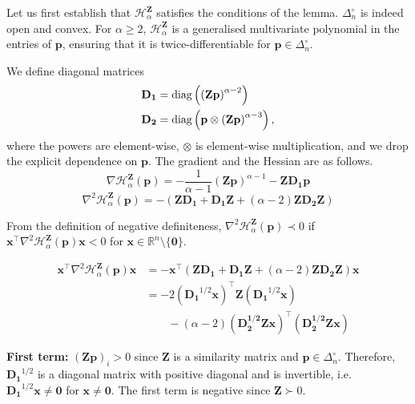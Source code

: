 \documentclass[aps,pre,floats,floatfix,superscriptaddress,twocolumn,final,10pt]{revtex4-2}
\theoremstyle{definition}
\renewcommand{\vec}[1]{\mathbf{#1}}
\newcommand{\entropy}[3]{\mathcal{H}^{#1}_{#2}\left(#3\right)}
\newcommand{\entropyname}[2]{\mathcal{H}^{#1}_{#2}}
\begin{document}
Let us first establish that $\entropyname{\vec{Z}}{\alpha}$ satisfies the conditions of the lemma. $\Delta_n^\circ$ is indeed open and convex. For $\alpha \geq2$, $\entropyname{\vec{Z}}{\alpha}$ is a generalised multivariate polynomial in the entries of $\vec{p}$, ensuring that it is twice-differentiable for $\vec{p}\in\Delta_n^\circ$.

We define diagonal matrices 
\begin{align*}
    \vec{D_1} &= \textnormal{diag}\left(\left(\vec{Zp}\right)^{\alpha-2}\right) \\
    \vec{D_2} &= \textnormal{diag}\left(\vec{p} \otimes \left(\vec{Zp}\right)^{\alpha-3}\right),
\end{align*}
where the powers are element-wise, $\otimes$ is element-wise multiplication, and we drop the explicit dependence on $\vec{p}$. The gradient and the Hessian are as follows.
\begin{equation*}
    \nabla \entropy{\vec{Z}}{\alpha}{\vec{p}} = - \frac{1}{\alpha - 1} \left(\vec{Zp}\right)^{\alpha-1} - \vec{Z} \vec{D_1} \vec{p}
\end{equation*}
\begin{equation*}
    \nabla^2 \entropy{\vec{Z}}{\alpha}{\vec{p}} = - \left( \vec{ZD_1} + \vec{D_1 Z} + (\alpha-2) \vec{Z D_2 Z} \right)
\end{equation*}

From the definition of negative definiteness, $\nabla^2 \entropy{\vec{Z}}{\alpha}{\vec{p}} \prec 0$ if $\vec{x}^\top \nabla^2 \entropy{\vec{Z}}{\alpha}{\vec{p}} \vec{x} < 0$ for $\vec{x} \in \mathbb{R}^n \setminus \{ \vec{0}\}$.

\begin{align*}
    \vec{x}^\top \nabla^2 \entropy{\vec{Z}}{\alpha}{\vec{p}} \vec{x} &=  - \vec{x}^\top \left( \vec{ZD_1} + \vec{D_1 Z} + (\alpha-2) \vec{Z D_2 Z} \right) \vec{x} \\
    &= - 2 \left( \vec{D_1}^{1/2}\vec{x} \right)^\top \vec{Z} \left( \vec{D_1}^{1/2}\vec{x} \right) \\
    & \qquad - (\alpha-2) \left(\vec{D_2^{1/2} Z x} \right)^\top \left(\vec{D_2^{1/2} Z x} \right)
\end{align*}

\textbf{First term:} $(\vec{Zp})_i >0$ since $\vec{Z}$ is a similarity matrix and $\vec{p}\in\Delta^\circ_n$. Therefore, $\vec{D_1}^{1/2}$ is a diagonal matrix with positive diagonal and is invertible, i.e. $\vec{D_1}^{1/2}\vec{x} \neq \vec{0}$ for $\vec{x}\neq\vec{0}$. The first term is negative since $\vec{Z}\succ0$.
\end{document}
